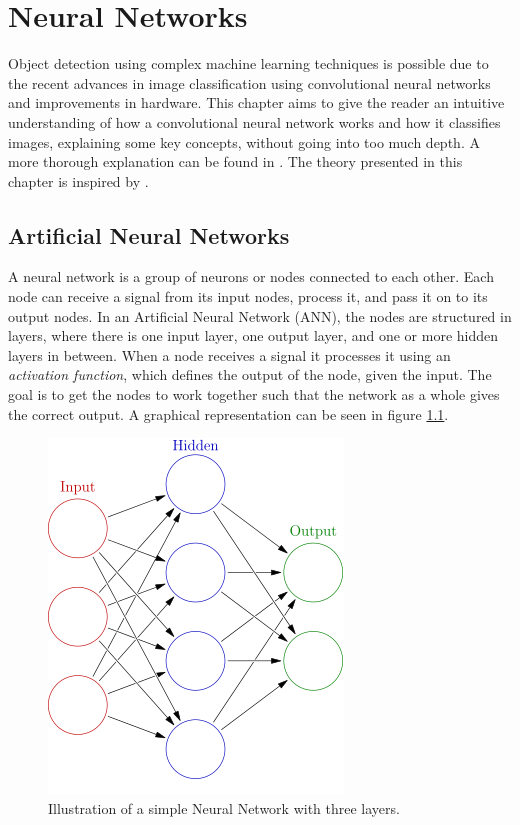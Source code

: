 
\chapter{Neural Networks}
Object detection using complex machine learning techniques is possible due to the recent advances in image classification using convolutional neural networks and improvements in hardware. This chapter aims to give the reader an intuitive understanding of how a convolutional neural network works and how it classifies images, explaining some key concepts, without going into too much depth. A more thorough explanation can be found in \citep{Krizhevsky2012}. The theory presented in this chapter is inspired by \citep{cnn_stanford}.

\section{Artificial Neural Networks}
A neural network is a group of neurons or nodes connected to each other. Each node can receive a signal from its input nodes, process it, and pass it on to its output nodes. In an Artificial Neural Network (ANN), the nodes are structured in layers, where there is one input layer, one output layer, and one or more hidden layers in between. When a node receives a signal it processes it using an \textit{activation function}, which defines the output of the node, given the input. The goal is to get the nodes to work together such that the network as a whole gives the correct output. A graphical representation can be seen in figure \ref{fig:NN}.

\begin{figure}
    \centering
    \includegraphics[scale=0.4]{fig/neural_network.png}
    \caption{Illustration of a simple Neural Network with three layers.}
    \label{fig:NN}
\end{figure}

